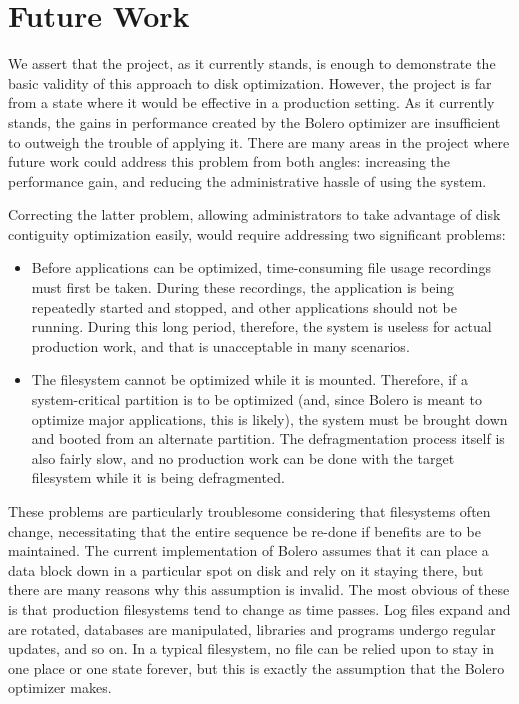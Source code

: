 \documentclass[10pt,twocolumn,letterpaper]{article}
\begin{document}
\section{Future Work}\label{sec:future}

We assert that the project, as it currently stands, is enough to demonstrate the basic validity of this approach to disk optimization. However, the project is far from a state where it would be effective in a production setting. As it currently stands, the gains in performance created by the Bolero optimizer are insufficient to outweigh the trouble of applying it. There are many areas in the project where future work could address this problem from both angles: increasing the performance gain, and reducing the administrative hassle of using the system.

Correcting the latter problem, allowing administrators to take advantage of disk contiguity optimization easily, would require addressing two significant problems:
\begin{itemize}
\item Before applications can be optimized, time-consuming file usage recordings must first be taken. During these recordings, the application is being repeatedly started and stopped, and other applications should not be running. During this long period, therefore, the system is useless for actual production work, and that is unacceptable in many scenarios.
\item The filesystem cannot be optimized while it is mounted. Therefore, if a system-critical partition is to be optimized (and, since Bolero is meant to optimize major applications, this is likely), the system must be brought down and booted from an alternate partition. The defragmentation process itself is also fairly slow, and no production work can be done with the target filesystem while it is being defragmented.
\end{itemize}

These problems are particularly troublesome considering that filesystems often change, necessitating that the entire sequence be re-done if benefits are to be maintained. The current implementation of Bolero assumes that it can place a data block down in a particular spot on disk and rely on it staying there, but there are many reasons why this assumption is invalid. The most obvious of these is that production filesystems tend to change as time passes. Log files expand and are rotated, databases are manipulated, libraries and programs undergo regular updates, and so on. In a typical filesystem, no file can be relied upon to stay in one place or one state forever, but this is exactly the assumption that the Bolero optimizer makes.
\end{document}
